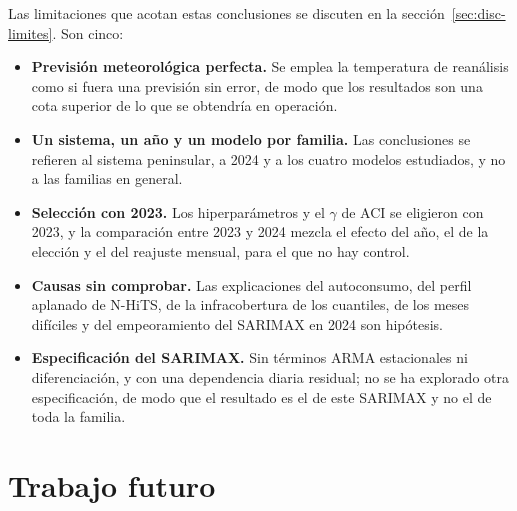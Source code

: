 Las limitaciones que acotan estas conclusiones se discuten en la
sección~\ref{sec:disc-limites}. Son cinco:
\begin{itemize}
	\item \textbf{Previsión meteorológica perfecta.} Se emplea la temperatura de
	reanálisis como si fuera una previsión sin error, de modo que los resultados son
	una cota superior de lo que se obtendría en operación.
	\item \textbf{Un sistema, un año y un modelo por familia.} Las conclusiones se
	refieren al sistema peninsular, a 2024 y a los cuatro modelos estudiados, y no a
	las familias en general.
	\item \textbf{Selección con 2023.} Los hiperparámetros y el $\gamma$ de ACI se
	eligieron con 2023, y la comparación entre 2023 y 2024 mezcla el efecto del
	año, el de la elección y el del reajuste mensual, para el que no hay control.
	\item \textbf{Causas sin comprobar.} Las explicaciones del autoconsumo, del
	perfil aplanado de N-HiTS, de la infracobertura de los cuantiles, de los meses
	difíciles y del empeoramiento del SARIMAX en 2024 son hipótesis.
	\item \textbf{Especificación del SARIMAX.} Sin términos ARMA estacionales ni
	diferenciación, y con una dependencia diaria residual; no se ha explorado otra
	especificación, de modo que el resultado es el de este SARIMAX y no el de toda
	la familia.
\end{itemize}

\section{Trabajo futuro}\label{sec:concl-futuro}

